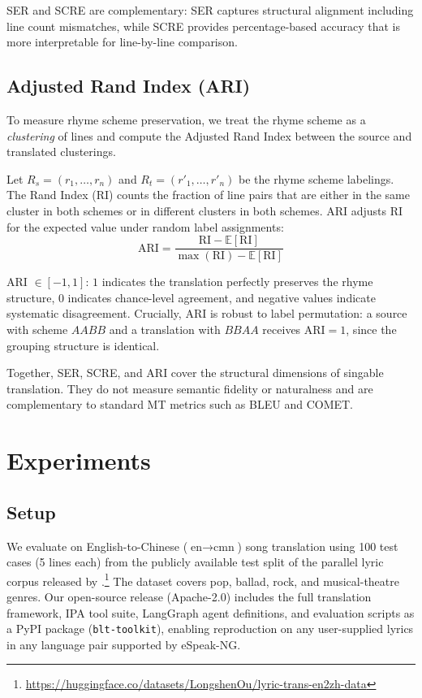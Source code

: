 \documentclass[11pt]{article}
\begin{document}
SER and SCRE are complementary: SER captures structural alignment including line count mismatches, while SCRE provides percentage-based accuracy that is more interpretable for line-by-line comparison.

\subsection{Adjusted Rand Index (ARI)}

To measure rhyme scheme preservation, we treat the rhyme scheme as a \emph{clustering} of lines and compute the Adjusted Rand Index \citep{hubert-arabie-1985} between the source and translated clusterings.

Let $R_s = (r_1, \ldots, r_n)$ and $R_t = (r'_1, \ldots, r'_n)$ be the rhyme scheme labelings.
The Rand Index (RI) counts the fraction of line pairs that are either in the same cluster in both schemes or in different clusters in both schemes.
ARI adjusts RI for the expected value under random label assignments:
\begin{equation}
    \text{ARI} = \frac{\text{RI} - \mathbb{E}[\text{RI}]}{\max(\text{RI}) - \mathbb{E}[\text{RI}]}
\end{equation}

ARI $\in [-1, 1]$: $1$ indicates the translation perfectly preserves the rhyme structure, $0$ indicates chance-level agreement, and negative values indicate systematic disagreement.
Crucially, ARI is robust to label permutation: a source with scheme $AABB$ and a translation with $BBAA$ receives $\text{ARI} = 1$, since the grouping structure is identical.

Together, SER, SCRE, and ARI cover the structural dimensions of singable translation.
They do not measure semantic fidelity or naturalness and are complementary to standard MT metrics such as BLEU and COMET.

\section{Experiments}
\label{sec:experiments}

\subsection{Setup}

We evaluate on English-to-Chinese ($\text{en} \rightarrow \text{cmn}$) song translation using 100 test cases (5 lines each) from the publicly available test split of the parallel lyric corpus released by \citet{ou-etal-2023-songs}.\footnote{\url{https://huggingface.co/datasets/LongshenOu/lyric-trans-en2zh-data}}
The dataset covers pop, ballad, rock, and musical-theatre genres.
Our open-source release (Apache-2.0) includes the full translation framework, IPA tool suite, LangGraph agent definitions, and evaluation scripts as a PyPI package (\texttt{blt-toolkit}), enabling reproduction on any user-supplied lyrics in any language pair supported by eSpeak-NG.
\end{document}
